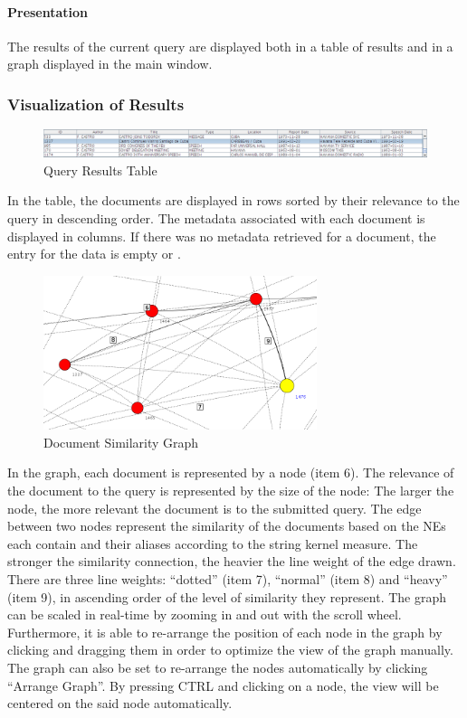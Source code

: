 \paragraph{Presentation}
The results of the current query are displayed both in a table of results and in a graph displayed in the main window.

\subsubsection{Visualization of Results}
\begin{figure}[ht]
\centering
\caption{Query Results Table}
\includegraphics[width=160mm]{table.png}
\end{figure}

In the table, the documents are displayed in rows sorted by their relevance to the query in descending order. The metadata associated with each document is displayed in columns. If there was no metadata retrieved for a document, the entry for the data is empty or .

\begin{figure}[ht]
\centering
\caption{Document Similarity Graph}
\includegraphics[width=80mm]{nodecloseup.png}
\end{figure}

In the graph, each document is represented by a node (item 6). The relevance of the document to the query is represented by the size of the node: The larger the node, the more relevant the document is to the submitted query. The edge between two nodes represent the similarity of the documents based on the NEs each contain and their aliases according to the string kernel measure. The stronger the similarity connection, the heavier the line weight of the edge drawn. There are three line weights: ``dotted'' (item 7), ``normal'' (item 8) and ``heavy'' (item 9), in ascending order of the level of similarity they represent. The graph can be scaled in real-time by zooming in and out with the scroll wheel. Furthermore, it is able to re-arrange the position of each node in the graph by clicking and dragging them in order to optimize the view of the graph manually. The graph can also be set to re-arrange the nodes automatically by clicking ``Arrange Graph''. By pressing CTRL and clicking on a node, the view will be centered on the said node automatically.

